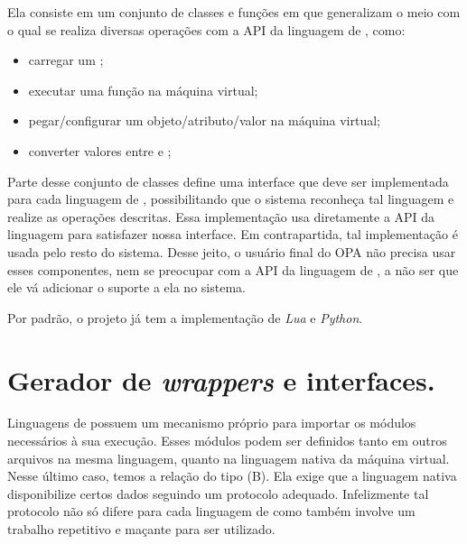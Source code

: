   Ela consiste em um conjunto de classes e funções em \CXX{} que generalizam o meio
  com o qual se realiza diversas operações com a API da linguagem de \script{}, como:
  \begin{itemize}
    \item carregar um \script{};
    \item executar uma função na máquina virtual;
    \item pegar/configurar um objeto/atributo/valor na máquina virtual;
    \item converter valores entre \CXX{} e \script{};
  \end{itemize}
  Parte desse conjunto de classes define uma interface que deve ser implementada para
  cada linguagem de \script{}, possibilitando que o sistema reconheça tal linguagem e 
  realize as operações descritas. Essa implementação usa diretamente a API da linguagem
  para satisfazer nossa interface. Em contrapartida, tal implementação é usada pelo 
  resto do sistema. Desse jeito, o usuário final do OPA não precisa usar esses 
  componentes, nem se preocupar com a API da linguagem de \script{}, a não ser que
  ele vá adicionar o suporte a ela no sistema.

  
  Por padrão, o projeto já tem a implementação de \textit{Lua} e \textit{Python}.
  
  
  
  \section{Gerador de \emph{wrappers} e interfaces.}
  \label{sec:estrutura:opwig}


  Linguagens de \script{} possuem um mecanismo próprio para importar os módulos
  necessários à sua execução. Esses módulos podem ser definidos tanto em outros
  arquivos na mesma linguagem, quanto na linguagem nativa da máquina virtual.
  Nesse último caso, temos a relação do tipo (B). Ela exige que a linguagem
  nativa disponibilize certos dados seguindo um protocolo adequado. Infelizmente
  tal protocolo não só difere para cada linguagem de \script{} como também
  involve um trabalho repetitivo e maçante para ser utilizado. 
  
